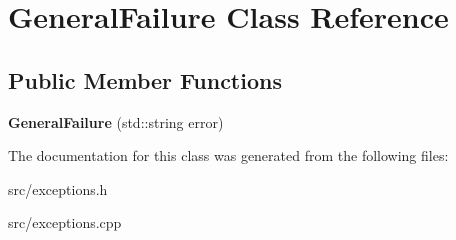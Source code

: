 \hypertarget{class_general_failure}{
\section{GeneralFailure Class Reference}
\label{class_general_failure}
}
\subsection*{Public Member Functions}
\begin{DoxyCompactItemize}
\item 
\hypertarget{class_general_failure_abe56426448fd86f00f2b0237eca23068}{
{\bfseries GeneralFailure} (std::string error)}
\label{class_general_failure_abe56426448fd86f00f2b0237eca23068}

\end{DoxyCompactItemize}


The documentation for this class was generated from the following files:\begin{DoxyCompactItemize}
\item 
src/exceptions.h\item 
src/exceptions.cpp\end{DoxyCompactItemize}
